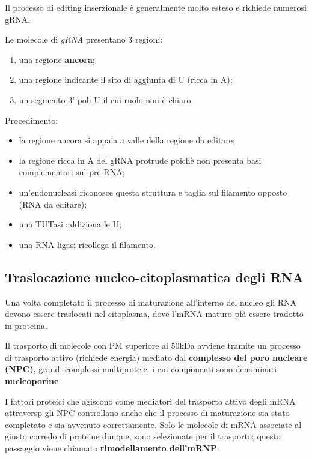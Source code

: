 \documentclass[11pt]{book}
\begin{document}
Il processo di editing inserzionale è generalmente molto esteso e
richiede numerosi gRNA.

Le molecole di \emph{gRNA} presentano 3 regioni:

\begin{enumerate}
\def\labelenumi{\arabic{enumi}.}
\itemsep1pt\parskip0pt
\item
  una regione \textbf{ancora};
\item
  una regione indicante il sito di aggiunta di U (ricca in A);
\item
  un segmento 3' poli-U il cui ruolo non è chiaro.
\end{enumerate}

Procedimento:

\begin{itemize}
\itemsep1pt\parskip0pt
\item
  la regione ancora si appaia a valle della regione da editare;
\item
  la regione ricca in A del gRNA protrude poichè non presenta basi
  complementari sul pre-RNA;
\item
  un'endonucleasi riconosce questa struttura e taglia sul filamento
  opposto (RNA da editare);
\item
  una TUTasi addiziona le U;
\item
  una RNA ligasi ricollega il filamento.
\end{itemize}

\subsection{Traslocazione nucleo-citoplasmatica degli
RNA}\label{traslocazione-nucleo-citoplasmatica-degli-rna}

Una volta completato il processo di maturazione all'interno del nucleo
gli RNA devono essere traslocati nel citoplasma, dove l'mRNA maturo pfà
essere tradotto in proteina.

Il trasporto di molecole con PM superiore ai 50kDa avviene tramite un
processo di trasporto attivo (richiede energia) mediato dal
\textbf{complesso del poro nucleare (NPC)}, grandi complessi
multiproteici i cui componenti sono denominati \textbf{nucleoporine}.

I fattori proteici che agiscono come mediatori del trasporto attivo
degli mRNA attraversp gli NPC controllano anche che il processo di
maturazione sia stato completato e sia avvenuto correttamente. Solo le
molecole di mRNA associate al giusto corredo di proteine dunque, sono
selezionate per il trasporto; questo passaggio viene chiamato
\textbf{rimodellamento dell'mRNP}.
\end{document}
